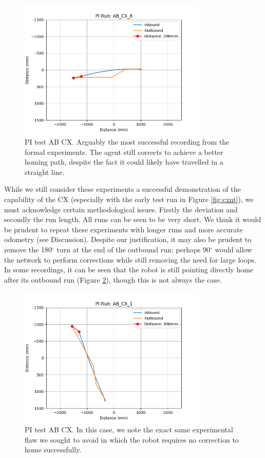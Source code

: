 \documentclass[a4paper,11pt,twoside,openright]{article}
\begin{document}
\begin{figure}[h!]
  \centering
  \includegraphics[width=0.8\textwidth]{AB_CX_8}
  \caption{\label{fig:abcx8i} PI test AB\textunderscore
    CX. Arguably the most successful recording from
    the formal experiments. The agent still corrects to achieve a
    better homing path, despite the fact it could likely have
    travelled in a straight line. }
\end{figure}

While we still consider these experiments a successful demonstration
of the capability of the CX (especially with the early test run in
Figure \ref{fig:cxnt}), we must acknowledge certain methodological
issues. Firstly the deviation and secondly the run length. All runs
can be seen to be very short. We think it would be prudent to repeat
these experiments with longer runs and more accurate odometry (see
Discussion). Despite our justification, it may also be prudent to
remove the 180$^{\circ}$ turn at the end of the outbound run; perhaps
90$^\circ$ would allow the network to perform corrections while still
removing the need for large loops. In some
recordings, it can be seen that the robot is still pointing directly
home after its outbound run (Figure \ref{fig:abcx1i}), though this is
not always the case.

\begin{figure}[h!]
  \centering
  \includegraphics[width=0.8\textwidth]{AB_CX_1}
  \caption{\label{fig:abcx1i} PI test AB\textunderscore
    CX. In this case, we note the exact same
    experimental flaw we sought to avoid in which the robot requires
    no correction to home successfully.}
\end{figure}
\end{document}
